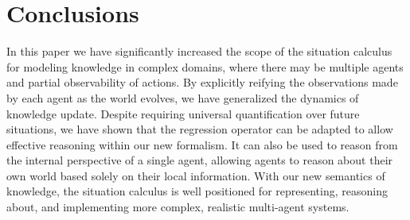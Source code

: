 \documentclass{ifaamas-submission}
\begin{document}
\section{Conclusions}

\label{sec:Conclusions}In this paper we have significantly increased
the scope of the situation calculus for modeling knowledge in complex
domains, where there may be multiple agents and partial observability
of actions. By explicitly reifying the observations made by each agent
as the world evolves, we have generalized the dynamics of knowledge
update. Despite requiring
universal quantification over future situations, we have shown that
the regression operator can be adapted to allow effective reasoning
within our new formalism. It can also be used to reason from the internal
perspective of a single agent, allowing agents to reason about their
own world based solely on their local information.
With our new semantics of knowledge, the situation calculus is well
positioned for representing, reasoning about, and implementing more
complex, realistic multi-agent systems.



\end{document}
